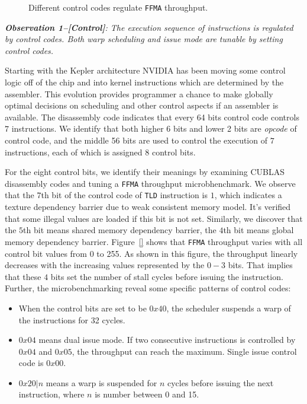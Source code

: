 \documentclass{sig-alternate-05-2015}
\begin{document}
\begin{figure}[htbp]
\begin{center}
\caption{Different control codes regulate {\tt FFMA} throughput.}
\label{fig:control}
\end{center}
\end{figure}

{\em {\bf Observation 1--[Control]}: The execution sequence of instructions is regulated by control codes. Both warp scheduling and issue mode are tunable by setting control codes.}

Starting with the Kepler architecture NVIDIA has been moving some control logic off of the chip and into kernel instructions which are determined by the assembler. This evolution provides programmer a chance to make globally optimal decisions on scheduling and other control aspects if an assembler is available. The disassembly code indicates that every 64 bits control code controls $7$ instructions. We identify that both higher $6$ bits and lower 2 bits are {\em opcode} of control code, and the middle 56 bits are used to control the execution of $7$ instructions, each of which is assigned $8$ control bits.

For the eight control bits, we identify their meanings by examining CUBLAS disassembly codes and tuning a {\tt FFMA} throughput microbhenchmark. We observe that the $7$th bit of the control code of {\tt TLD} instruction is $1$, which indicates a texture dependency barrier due to weak consistent memory model. It's verified that some illegal values are loaded if this bit is not set. Similarly, we discover that the $5$th bit means shared memory dependency barrier, the $4$th bit means global memory dependency barrier. Figure~\ref{} shows that {\tt FFMA} throughput varies with all control bit values from 0 to 255. As shown in this figure, the throughput linearly decreases with the increasing values represented by the $0-3$ bits. That implies that these $4$ bits set the number of stall cycles before issuing the instruction. Further, the microbenchmarking reveal some specific patterns of control codes:

\begin{itemize}
\item When the control bits are set to be $0x40$, the scheduler suspends a warp of the instructions for 32 cycles.
\item $0x04$ means dual issue mode. If two consecutive instructions is controlled by $0x04$ and $0x05$, the throughput can reach the maximum. Single issue control code is $0x00$.
\item $0x20|n$ means a warp is suspended for $n$ cycles before issuing the next instruction, where $n$ is number between 0 and 15.
\end{itemize}
\end{document}
